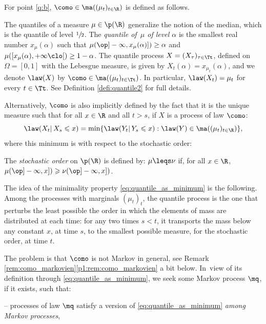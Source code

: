 For point \eqref{q:b}, $\como\in\ma((\mu_t)_{t\in\R})$ is defined as follows.

\begin{reminder}\label{remind:quantile}The quantiles of a measure $\mu\in\p(\R)$ generalize the notion of the median, which is the quantile of level $\sfrac{1}{2}$.
The \emph{quantile of~$\mu$ of level $\alpha$} is the smallest real number $x_\mu(\alpha)$ such that $\mu(\op]-\infty,x_\mu(\alpha)])\geq \alpha$ and $\mu([x_\mu(\alpha),+\infty\clo[)\geq 1-\alpha$.
The quantile process $X=(X_\tau)_{\tau\in \Tt}$, defined on $\Omega=[0,1]$ with the Lebesgue measure, is given by $X_t(\alpha)=x_{\mu_t}(\alpha)$, and we denote $\law(X)$ by $\como\in \ma((\mu_t)_{t\in \Tt})$. In particular, $\law(X_t)=\mu_t$ for every $t\in \Tt$. See Definition \ref{defi:quantile2} for full details.
\end{reminder}

Alternatively, $\como$ is also implicitly defined by the fact that it is the unique measure such that for all $x\in\R$ and all $t>s$, if $X$ is a process of law $\como$:
\begin{equation}\label{eq:quantile_as_minimum}\law(X_{t}|\,X_{s}\leqslant x)=\min\{\law(Y_{t}|\,Y_{s}\leqslant x): \law(Y)\in\ma((\mu_t)_{t\in\R})\},
\end{equation}
where this minimum is with respect to the stochastic order:

\begin{reminder}\label{remind:sto} The \emph{stochastic order} on $\p(\R)$ is defined by: $\mu\leqs\nu$ if, for all $x\in\R$, $\mu(\op]-\infty,x])\geqslant\nu(\op]-\infty,x])$.
\end{reminder}

The idea of the minimality property \eqref{eq:quantile_as_minimum} is the following. Among the processes with marginals $(\mu_t)_t$, the quantile process is the one that perturbs the least possible the order in which the elements of mass are distributed at each time: for any two times $s<t$, it transports the mass below any constant $x$, at time $s$, to the smallest possible measure, for the stochastic order, at time $t$.

The problem is that $\como$ is not Markov in general, see Remark \ref{rem:como_markovien}\eqref{p1:rem:como_markovien} a bit below. In~view of its definition through \eqref{eq:quantile_as_minimum}, we seek some Markov process $\mq$, if it exists, such that:

-- processes of law $\mq$ satisfy a version of \eqref{eq:quantile_as_minimum} \emph{among Markov processes},

